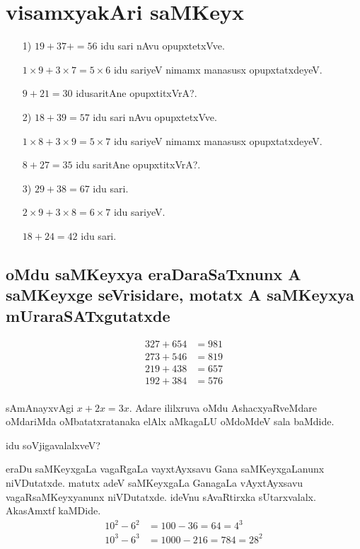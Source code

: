 \chapter{visamxyakAri saMKeyx}

\begin{itemize}
\item[{\rm 1)}] $19+37+ = 56$ idu sari nAvu opupxtetxVve.

$1 \times 9+3 \times 7 = 5 \times 6 $ idu sariyeV nimamx manasusx opupxtatxdeyeV.

$9+21 =30$ idusaritAne opupxtitxVrA?.

\item[{\rm 2)}] $18+39 = 57$ idu sari nAvu opupxtetxVve.

$1 \times 8+3 \times 9 = 5 \times 7 $  idu sariyeV nimamx manasusx opupxtatxdeyeV.

$8 + 27 = 35$ idu saritAne opupxtitxVrA?.

\item[{\rm 3)}] $29 + 38 = 67$ idu sari.

$2\times 9 + 3 \times 8 = 6 \times 7$ idu sariyeV.

$18+24 = 42$ idu sari.
\end{itemize}

\section*{oMdu saMKeyxya eraDaraSaTxnunx A saMKeyxge seVrisidare, motatx A saMKeyxya mUraraSATxgutatxde}
\begin{align*}
327+654 &= 981\\
273+546 &= 819\\
219+438 &= 657\\
192+384 &= 576\\
\end{align*}

sAmAnayxvAgi $x+2x=3x$. Adare ililxruva oMdu AshacxyaRveMdare oMdariMda oMbatatxratanaka elAlx aMkagaLU oMdoMdeV sala baMdide.

idu soVjigavalalxveV?

eraDu saMKeyxgaLa vagaRgaLa vayxtAyxsavu Gana saMKeyxgaLanunx niVDutatxde. matutx adeV saMKeyxgaLa GanagaLa vAyxtAyxsavu vagaRsaMKeyxyanunx niVDutatxde. ideVnu sAvaRtirxka sUtarxvalalx. AkasAmxtf kaMDide.
\begin{align*}
10^2-6^2 &= 100-36 = 64 = 4^3\\
10^3-6^3 &= 1000-216 = 784 = 28^2
\end{align*}

